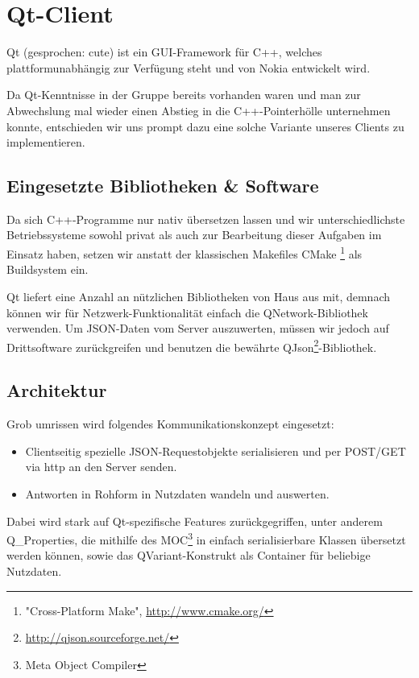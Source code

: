\documentclass[12pt, a4paper]{scrartcl}
\begin{document}
\clearpage
\section{Qt-Client}

Qt (gesprochen: cute) ist ein GUI-Framework für C++, welches
plattformunabhängig zur Verfügung steht und von Nokia entwickelt wird.

Da Qt-Kenntnisse in der Gruppe bereits vorhanden waren und man zur Abwechslung mal wieder einen Abstieg in die C++-Pointerhölle unternehmen konnte, entschieden wir uns prompt dazu eine solche Variante unseres Clients zu implementieren.
\np

\subsection{Eingesetzte Bibliotheken \& Software}
Da sich C++-Programme nur nativ übersetzen lassen und wir unterschiedlichste 
Betriebssysteme sowohl privat als auch zur Bearbeitung dieser Aufgaben im Einsatz 
haben, setzen wir anstatt der klassischen Makefiles CMake
\footnote{"Cross-Platform Make", \url{http://www.cmake.org/}} als Buildsystem ein.
\np
 
Qt liefert eine Anzahl an nützlichen Bibliotheken von Haus aus mit, demnach
können wir für Netzwerk-Funktionalität einfach die QNetwork-Bibliothek verwenden.
Um JSON-Daten vom Server auszuwerten, müssen wir jedoch auf Drittsoftware
zurückgreifen und benutzen die bewährte QJson\footnote{\url{http://qjson.sourceforge.net/}}-Bibliothek.
\np
\subsection{Architektur}
Grob umrissen wird folgendes Kommunikationskonzept eingesetzt:

\begin{itemize}
	\item Clientseitig spezielle JSON-Requestobjekte serialisieren und per POST/GET via http an den Server senden.
	\item Antworten in Rohform in Nutzdaten wandeln und auswerten.
\end{itemize}

Dabei wird stark auf Qt-spezifische Features zurückgegriffen, unter anderem Q\_Properties, die mithilfe des MOC\footnote{Meta Object Compiler} in einfach serialisierbare Klassen übersetzt werden können, sowie das QVariant-Konstrukt als Container für beliebige Nutzdaten.   
\np

\end{document}
